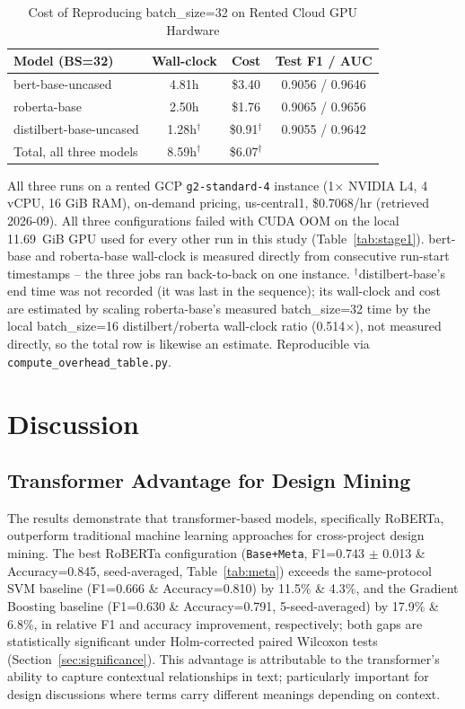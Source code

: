 \documentclass[preprint,12pt]{elsarticle}
\begin{document}
\begin{table}[t]
\centering
\setlength{\tabcolsep}{4pt}
\begin{tabular}{lccc}
\toprule
\textbf{Model (BS=32)} & \textbf{Wall-clock} & \textbf{Cost} & \textbf{Test F1 / AUC} \\
\midrule
bert-base-uncased & 4.81h & \$3.40 & 0.9056 / 0.9646 \\
roberta-base & 2.50h & \$1.76 & 0.9065 / 0.9656 \\
distilbert-base-uncased & 1.28h$^\dagger$ & \$0.91$^\dagger$ & 0.9055 / 0.9642 \\
\midrule
Total, all three models & 8.59h$^\dagger$ & \$6.07$^\dagger$ & \\
\bottomrule
\end{tabular}
\caption{Cost of Reproducing batch\_size=32 on Rented Cloud GPU Hardware}
\label{tab:batch32cost}
\begin{flushleft}
\footnotesize All three runs on a rented GCP \texttt{g2-standard-4} instance (1$\times$ NVIDIA L4, 4 vCPU, 16 GiB RAM), on-demand pricing, us-central1, \$0.7068/hr (retrieved 2026-09). All three configurations failed with CUDA OOM on the local 11.69~GiB GPU used for every other run in this study (Table~\ref{tab:stage1}). bert-base and roberta-base wall-clock is measured directly from consecutive run-start timestamps -- the three jobs ran back-to-back on one instance. $^\dagger$distilbert-base's end time was not recorded (it was last in the sequence); its wall-clock and cost are estimated by scaling roberta-base's measured batch\_size=32 time by the local batch\_size=16 distilbert/roberta wall-clock ratio (0.514$\times$), not measured directly, so the total row is likewise an estimate. Reproducible via \texttt{compute\_overhead\_table.py}.
\end{flushleft}
\end{table}

\section{Discussion}
\label{sec:discussion}

\subsection{Transformer Advantage for Design Mining}

The results demonstrate that transformer-based models, specifically RoBERTa, outperform traditional machine learning approaches for cross-project design mining. The best RoBERTa configuration (\texttt{Base+Meta}, F1=0.743 $\pm$ 0.013 \& Accuracy=0.845, seed-averaged, Table~\ref{tab:meta}) exceeds the same-protocol SVM baseline (F1=0.666 \& Accuracy=0.810) by 11.5\% \& 4.3\%, and the Gradient Boosting baseline (F1=0.630 \& Accuracy=0.791, 5-seed-averaged) by 17.9\% \& 6.8\%, in relative F1 and accuracy improvement, respectively; both gaps are statistically significant under Holm-corrected paired Wilcoxon tests (Section~\ref{sec:significance}). This advantage is attributable to the transformer's ability to capture contextual relationships in text; particularly important for design discussions where terms carry different meanings depending on context.
\end{document}
